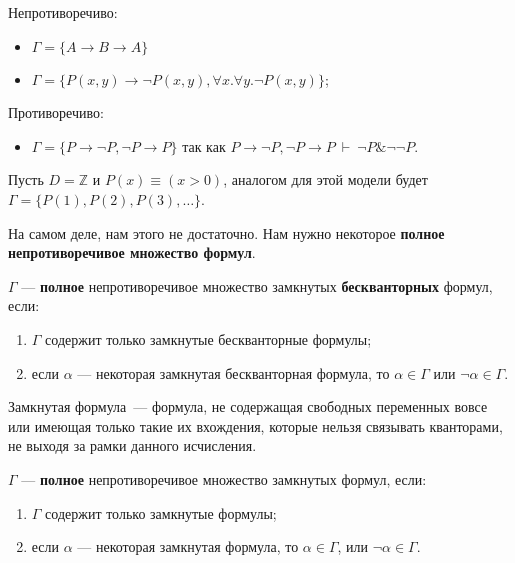 \begin{example}
    Непротиворечиво: \begin{itemize}
        \item $\Gamma = \{A \rightarrow B \rightarrow A\}$
        \item $\Gamma = \{P(x,y)\rightarrow\neg P(x,y), \forall x.\forall y.\neg P(x,y)\}$;
    \end{itemize}

    Противоречиво: \begin{itemize}
        \item $\Gamma = \{P\rightarrow\neg P, \neg P \rightarrow P\}$
        так как
        $P\rightarrow\neg P, \neg P \rightarrow P \ \vdash\  \neg P \& \neg\neg P$.
\end{itemize}

    Пусть $D = \mathbb{Z}$ и $P(x) \equiv (x > 0)$, аналогом для этой модели
    будет $\Gamma = \{P(1), P(2), P(3), \dots\}$.
\end{example}

На самом деле, нам этого не достаточно. Нам нужно некоторое \textbf{полное непротиворечивое множество формул}.
\begin{definition}
    $\Gamma$ --- \textbf{полное} непротиворечивое множество замкнутых \textbf{бескванторных} формул,
если:
\begin{enumerate}\item $\Gamma$ содержит только замкнутые бескванторные формулы;
\item если $\alpha$ --- некоторая замкнутая бескванторная формула, то $\alpha\in\Gamma$ или $\neg\alpha\in\Gamma$.
\end{enumerate}
\end{definition}
\begin{note}
    Замкнутая формула~--- формула, не содержащая свободных переменных вовсе или имеющая только такие их вхождения, которые нельзя связывать кванторами, не выходя за рамки данного исчисления.
\end{note}

\begin{definition}
    $\Gamma$ --- \textbf{полное} непротиворечивое множество замкнутых формул, если:
\begin{enumerate}\item $\Gamma$ содержит только замкнутые формулы;
\item если $\alpha$ --- некоторая замкнутая формула, то $\alpha \in \Gamma$, или $\neg\alpha \in \Gamma$.
\end{enumerate}
\end{definition}

